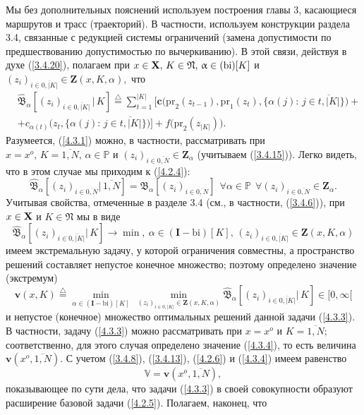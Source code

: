 \documentclass[11pt,twoside,openany]{report}
\newcommand{\bfn}{\begin{equation}}
\newcommand{\efn}{\end{equation}}
\newcommand{\df}{\stackrel{\triangle}{=}}
\newcommand{\ov}{\overline}
\newcommand{\al}{\alpha}
\newcommand{\fa}{\forall}
\newcommand{\bx}{{\bf X}}
\newcommand{\bbp}{{\mathbb P}}
\begin{document}
{Мы без  дополнительных пояснений используем построения главы 3, касающиеся
маршрутов и трасс (траекторий). В частности, используем конструкции
раздела 3.4, связанные с редукцией системы ограничений (замена допустимости
по предшествованию допустимостью по вычеркиванию). В этой связи, действуя
в духе (\ref{3.4.20}),
полагаем при $x\in \bx,\,K\in \mathfrak{N},\,\al\in (\mathrm{bi})[K]$ и
$(z_i)_{i\in\ov{0,|K|}} \in \mathbf{Z}(x,K,\al),$ что
\begin{eqnarray}
&\widehat{\mathfrak{B}}_\al[(z_i)_{i\in\ov{0,|K|}}\,\bigl|\,K]  \df
\sum\limits_{t=1}^{|K|}\bigl[\mathbf{c}\bigl(\mathrm{pr}_2(z_{t-1}),\mathrm{pr}_1(z_t),\{\al(j):\,
j\in \ov{t,|K|}\}\bigl) +
&\nonumber\\
&+ c_{\al(t)}\bigl(z_t, \{\al(j):\, j\in \ov{t,|K|}\}\bigl)\bigl] +
f\bigl(\mathrm{pr}_2(z_{|K|})\bigl).
&\label{4.3.1}
\end{eqnarray}
Разумеется, (\ref{4.3.1}) можно, в частности, рассматривать при
$x=x^o,\,K= \ov{1,N},\,\al\in \bbp$ и
$(z_i)_{i\in\ov{0,N}}\in \mathbf{Z}_\al$ (учитываем (\ref{3.4.15})).
Легко видеть, что в этом случае
мы приходим к (\ref{4.2.4}):
\bfn\label{4.3.2}
\widehat{\mathfrak{B}}_\al[(z_i)_{i\in\ov{0,N}}|\,\ov{1,N}] = \mathfrak{B}_\al
[(z_i)_{i\in\ov{0,N}}]
\ \ \fa\al\in \bbp\ \ \fa (z_i)_{i\in\ov{0,N}}\in \mathbf{Z}_\al.
\efn
Учитывая свойства, отмеченные в разделе 3.4   (см., в частности,
(\ref{3.4.6})), при $x\in \bx$ и $K\in \mathfrak{N}$ мы в виде
\bfn\label{4.3.3} \widehat{\mathfrak{B}}_\al[(z_i)_{i\in\ov{0,|K|}}|\,K]
\longrightarrow \min,\ \al\in (\mathbf{I}-\mathrm{bi})[K],\,
(z_i)_{i\in\ov{0,|K|}}\in \mathbf{Z}(x,K,\al)
\efn
имеем экстремальную задачу, у которой ограничения совместны, а
пространство решений составляет непустое конечное множество; поэтому
определено значение (экстремум)
\bfn\label{4.3.4}\mathbf{v}(x,K) \df \min\limits_{\al\in (\mathbf{I}-
\mathrm{bi})[K]}\ \min\limits_{(z_i)_{i\in\ov{0,|K|}}\in
\mathbf{Z}(x,K,\al)}\widehat{\mathfrak{B}}_\al[(z_i)_{i\in\ov{0,|K|}}|\,K]
\in [0,\infty[
\efn
и непустое (конечное) множество оптимальных решений данной задачи
(\ref{4.3.3}). В частности, задачу (\ref{4.3.3}) можно рассматривать
при $x=x^o$ и $K=\ov{1,N};$ соответственно, для этого случая определено
значение (\ref{4.3.4}), то есть величина $\mathbf{v}(x^o,\ov{1,N}).$ С
учетом (\ref{3.4.8}), (\ref{3.4.13}), (\ref{4.2.6}) и (\ref{4.3.4}) имеем
равенство
\bfn\label{4.3.5}
\mathbb{V} = \mathbf{v}(x^o,\ov{1,N}),
\efn
показывающее по сути дела, что задачи (\ref{4.3.3}) в своей совокупности
образуют расширение базовой задачи (\ref{4.2.5}). Полагаем, наконец, что
}
\end{document}
